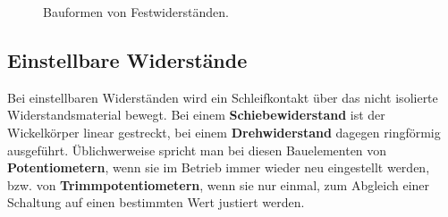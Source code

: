 \begin{figure}[H]
\centering
\caption{Bauformen von Festwiderständen.}
\label{fig_IIg}
\end{figure}
\subsection{Einstellbare Widerstände}
Bei einstellbaren Widerständen wird ein Schleifkontakt über das nicht isolierte Widerstandsmaterial bewegt. Bei einem \textbf{Schiebewiderstand} ist der Wickelkörper linear gestreckt, bei einem \textbf{Drehwiderstand} dagegen ringförmig ausgeführt. Üblichwerweise spricht man bei diesen Bauelementen von \textbf{Potentiometern}, wenn sie im Betrieb immer wieder neu eingestellt werden, bzw. von \textbf{Trimmpotentiometern}, wenn sie nur einmal, zum Abgleich einer Schaltung auf einen bestimmten Wert justiert werden.
